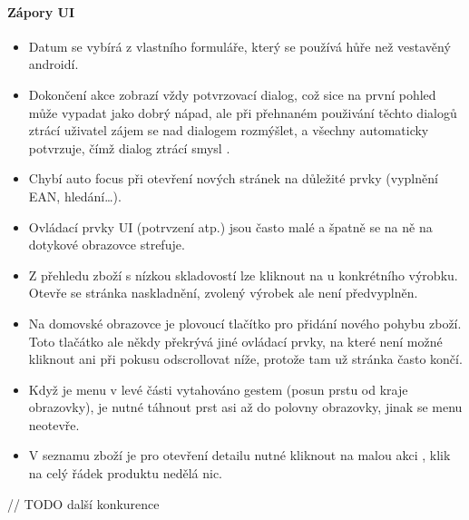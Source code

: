 \paragraph{Zápory UI}
\begin{itemize}
	\item Datum se vybírá z vlastního formuláře, který se používá hůře než vestavěný androidí.
	\item Dokončení akce zobrazí vždy potvrzovací dialog, což sice na první pohled může vypadat jako dobrý nápad, ale při přehnaném použivání těchto dialogů ztrácí uživatel zájem se nad dialogem rozmýšlet, a všechny automaticky potvrzuje, čímž dialog ztrácí smysl \cite{nn-dialogs}.
	\item Chybí auto focus při otevření nových stránek na důležité prvky (vyplnění EAN, hledání…).
	\item Ovládací prvky UI (potrvzení atp.) jsou často malé a špatně se na ně na dotykové obrazovce strefuje.
	\item Z přehledu zboží s nízkou skladovostí lze kliknout na  u konkrétního výrobku. Otevře se stránka naskladnění, zvolený výrobek ale není předvyplněn.
	\item Na domovské obrazovce je plovoucí tlačítko pro přidání nového pohybu zboží. Toto tlačátko ale někdy překrývá jiné ovládací prvky, na které není možné kliknout ani při pokusu odscrollovat níže, protože tam už stránka často končí.
	\item Když je menu v levé části vytahováno gestem (posun prstu od kraje obrazovky), je nutné táhnout prst asi až do polovny obrazovky, jinak se menu neotevře.
	\item V seznamu zboží je pro otevření detailu nutné kliknout na malou akci , klik na celý řádek produktu nedělá nic.
\end{itemize}

// TODO další konkurence
